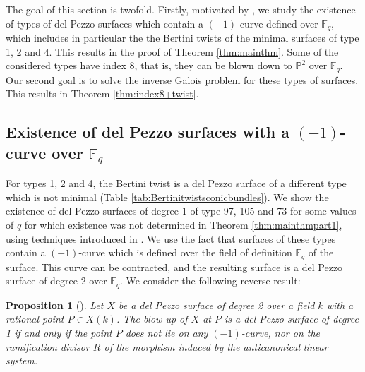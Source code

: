 \documentclass[a4paper, 11pt, reqno]{amsart}
\numberwithin{equation}{section} \numberwithin{figure}{section}
\def \F {{\mathbb F}}
\def \P {{\mathbb P}}
\newtheorem{proposition}[lemma]{Proposition}
\theoremstyle{definition}
\numberwithin{lemma}{section}
\begin{document}

The goal of this section is twofold. Firstly, motivated by \cite[\S5.2]{BFL}, we study the existence of types of del Pezzo surfaces which contain a $(-1)$-curve defined over $\F_q$, which includes in particular the the Bertini twists of the minimal surfaces of type 1, 2 and 4. This results in the proof of Theorem \ref{thm:mainthm}. Some of the considered types have index 8, that is, they can be blown down to $\P^2$ over $\F_q$. Our second goal is to solve the inverse Galois problem for these types of surfaces. This results in Theorem \ref{thm:index8+twist}.

\subsection{Existence of del Pezzo surfaces with a $(-1)$-curve over $\F_q$}

For types 1, 2 and 4, the Bertini twist is a del Pezzo surface of a different type which is not minimal (Table \ref{tab:Bertinitwistsconicbundles}). We show the existence of del Pezzo surfaces of degree 1 of type 97, 105 and 73 for some values of $q$ for which existence was not determined in Theorem \ref{thm:mainthmpart1}, using techniques introduced in \cite[\S5.2]{BFL}. We use the fact that surfaces of these types contain a $(-1)$-curve which is defined over the field of definition $\F_q$ of the surface. This curve can be contracted, and the resulting surface is a del Pezzo surface of degree 2 over $\F_q$. We consider the following reverse result:

\begin{proposition}[{\cite[Corollary 14]{STVA}}]\label{prop:STVcor14}
    Let $X$ be a del Pezzo surface of degree 2 over a field $k$ with a rational point $P \in X(k)$. The blow-up of $X$ at $P$ is a del Pezzo surface of degree 1 if and only if the point $P$ does not lie on any $(-1)$-curve, nor on the ramification divisor $R$ of the morphism induced by the anticanonical linear system.
\end{proposition}
\end{document}

